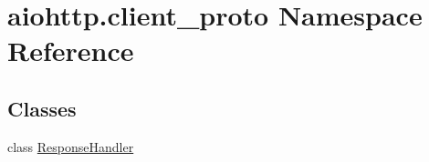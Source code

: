 \hypertarget{namespaceaiohttp_1_1client__proto}{}\section{aiohttp.\+client\+\_\+proto Namespace Reference}
\label{namespaceaiohttp_1_1client__proto}
\subsection*{Classes}
\begin{DoxyCompactItemize}
\item 
class \hyperlink{classaiohttp_1_1client__proto_1_1_response_handler}{Response\+Handler}
\end{DoxyCompactItemize}
